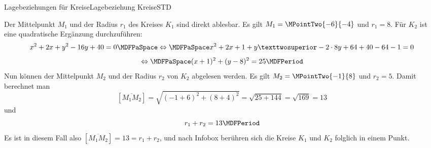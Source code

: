 \begin{MXContent}{Lagebeziehungen für Kreise}{Lagebeziehung Kreise}{STD}
\begin{MExercise}
\begin{MHint}{\iSolution}
Der Mittelpunkt $M_1$ und der Radius $r_1$ des Kreises $K_1$ sind direkt ablesbar. Es gilt $M_1=\MPointTwo{-6}{-4}$ und $r_1=8$. Für $K_2$ ist eine quadratische Ergänzung durchzuführen:
\[
 x^2+2x+y^2-16y+40=0\MDFPaSpace\Leftrightarrow\MDFPaSpace x^2+2x+1 + y²-2\cdot8y+64+40-64-1=0
\]
\[
 \Leftrightarrow\MDFPaSpace (x+1)^2+(y-8)^2=25\MDFPeriod
\]
Nun können der Mittelpunkt $M_2$ und der Radius $r_2$ von $K_2$ abgelesen werden. Es gilt $M_2=\MPointTwo{-1}{8}$ und $r_2=5$. Damit berechnet man
\[
 [\overline{M_1 M_2}]=\sqrt{(-1+6)^2+(8+4)^2}=\sqrt{25+144}=\sqrt{169}=13
\]
und
\[
 r_1+r_2=13 \MDFPeriod
\]
Es ist in diesem Fall also $[\overline{M_1 M_2}]=13=r_1+r_2$, und nach Infobox  berühren sich die Kreise $K_1$ und $K_2$ folglich in einem Punkt.
\end{MHint}


\end{MExercise}

\end{MXContent}

